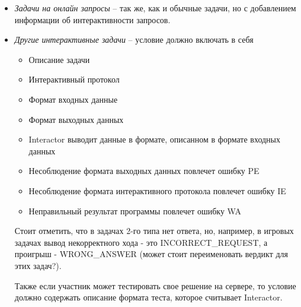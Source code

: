 \begin{itemize}
    \item \textit{Задачи на онлайн запросы} -- так же, как и обычные задачи, но с добавлением информации об интерактивности запросов.
    \item \textit{Другие интерактивные задачи} -- условие должно включать в себя
        \begin{itemize}
            \item Описание задачи
            \item Интерактивный протокол
            \item Формат входных данные
            \item Формат выходных данных
        \end{itemize}

        \begin{itemize}
            \item Interactor выводит данные в формате, описанном в формате входных данных
            \item Несоблюдение формата выходных данных повлечет ошибку PE
            \item Несоблюдение формата интерактивного протокола повлечет ошибку IE %
            \item Неправильный результат программы повлечет ошибку WA
        \end{itemize}

        Стоит отметить, что в задачах 2-го типа нет ответа, но, например, в игровых задачах вывод некорректного хода - это INCORRECT\_REQUEST,
        а проигрыш - WRONG\_ANSWER (может стоит переименовать вердикт для этих задач?).

        Также если участник может тестировать свое решение на сервере,
        то условие должно содержать описание формата теста, которое считывает Interactor.
\end{itemize}


